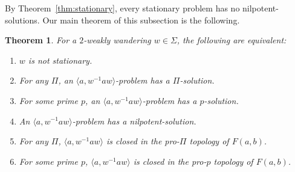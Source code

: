 \documentclass[10pt,a4paper]{amsart}
\newtheorem{theorem}{Theorem}[section]
\theoremstyle{definition}
\theoremstyle{definition}
\numberwithin{equation}{section}
\begin{document}
By Theorem~\ref{thm:stationary}, every stationary problem has no nilpotent-solutions. Our main theorem of this subsection is the following.

\begin{theorem}\label{thm:2ww} For a  $2$-weakly wandering $w\in\Sigma$, the following are equivalent:
\begin{enumerate}
\item[(i)] $w$ is not stationary.
\item[(ii)] For any $\Pi$, an $\langle a, w^{-1}aw\rangle$-problem has a $\Pi$-solution.
\item[(iii)] For some prime $p$, an $\langle a, w^{-1}aw\rangle$-problem has a $p$-solution.
\item[(iv)] An $\langle a, w^{-1}aw\rangle$-problem has a nilpotent-solution.
\item[(v)] For any $\Pi$, $\langle a, w^{-1}aw\rangle$ is closed in the pro-$\Pi$ topology of $F(a, b)$.
\item[(vi)] For some prime $p$, $\langle a, w^{-1}aw\rangle$ is closed in the pro-$p$ topology of $F(a, b)$.
\end{enumerate}
\end{theorem}
\end{document}
